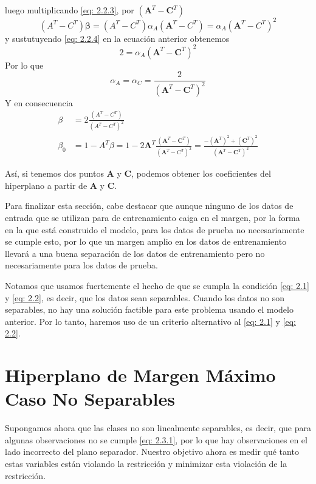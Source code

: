 \documentclass[letterpaper,12pt,oneside]{book}
\begin{document}
{{{luego multiplicando \eqref{eq: 2.2.3}, por $(\textbf{A}^T - \textbf{C}^T)$ 
    \begin{equation*}
        (A^T - C^T) \boldsymbol{\beta} =(A^T - C^T)\alpha_A(\textbf{A}^T - C^T)=\alpha_A(\textbf{A}^T - C^T)^2
    \end{equation*}
y sustutuyendo \eqref{eq: 2.2.4} en la ecuación anterior obtenemos 
    \begin{equation*}
        2 =\alpha_A(\textbf{A}^T - \textbf{C}^T)^2
    \end{equation*}
Por lo que 
    \begin{equation*}
        \alpha_A=\alpha_C=\frac{2}{(\textbf{A}^T - \textbf{C}^T)^2}
    \end{equation*}
Y en consecuencia 
    \begin{align*}
        \beta &=2\frac{(A^T - C^T)}{(A^T - C^T)^2} \\
        \beta_0 &=1-A^T\beta=1-2 \textbf{A}^T \frac{(\textbf{A}^T - \textbf{C}^T)}{(\textbf{A}^T - C^T)^2}=\frac{-(\textbf{A}^T)^2 +(\textbf{C}^T)^2}{(\textbf{A}^T - \textbf{C}^T)^2}
    \end{align*}

       Así, si tenemos dos puntos \( \textbf{A} \) y \( \textbf{C} \), podemos obtener los coeficientes del hiperplano a partir de \( \textbf{A} \) y \( \textbf{C} \).

Para finalizar esta sección, cabe destacar que aunque ninguno de los datos de entrada que se utilizan para de entrenamiento caiga en el margen, por la forma en la que está construido el modelo, para los datos de prueba no necesariamente se cumple esto, por lo que un margen amplio en los datos de entrenamiento llevará a una buena separación de los datos de entrenamiento pero no necesariamente para los datos de prueba.

Notamos que usamos fuertemente el hecho de que se cumpla la condición \eqref{eq: 2.1} y \eqref{eq: 2.2}, es decir, que los datos sean separables. Cuando los datos no son separables, no hay una solución factible para este problema usando el modelo anterior. Por lo tanto, haremos uso de un criterio alternativo al \eqref{eq: 2.1} y \eqref{eq: 2.2}.
 }
    
    
    
    
    
    
    
    \section{Hiperplano de Margen Máximo Caso No Separables }
    { Supongamos ahora que las clases no son linealmente separables, es decir, que para algunas observaciones no se cumple \eqref{eq: 2.3.1}, por lo que hay observaciones en el lado incorrecto del plano separador. Nuestro objetivo ahora es medir qué tanto estas variables están violando la restricción y minimizar esta violación de la restricción.

}}}
\end{document}
